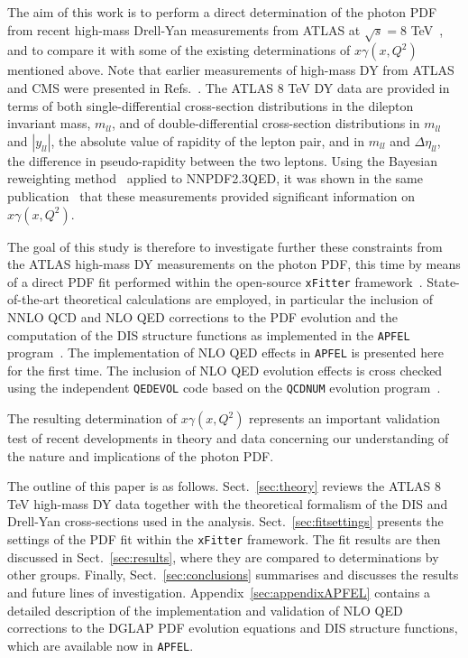 The aim of this work is to perform a direct determination of the
photon PDF from recent high-mass Drell-Yan measurements from
ATLAS  at $\sqrt{s}=8$ TeV~\cite{Aad:2016zzw}, and to
compare it with some of the existing determinations of $x\gamma(x,Q^2)$
mentioned above.
%
Note that
earlier measurements of high-mass DY from ATLAS and CMS were presented
in Refs.~\cite{CMS:2014jea,Chatrchyan:2013tia,Aad:2013iua}.
%
The ATLAS 8 TeV DY data are provided in terms of both
single-differential cross-section distributions in the dilepton invariant mass,
$m_{ll}$, and of double-differential 
cross-section distributions in $m_{ll}$ and $|y_{ll}|$, the absolute value of rapidity of the
lepton pair, and in $m_{ll}$ and $\Delta\eta_{ll}$, the difference in
pseudo-rapidity between the two leptons.
%
Using the Bayesian reweighting method~\cite{Ball:2011gg,Ball:2010gb}
applied to NNPDF2.3QED, it was shown in the
same publication~\cite{Aad:2016zzw} that these
measurements provided significant information on $x\gamma(x,Q^2)$.

The goal of this study is therefore to investigate further these
constraints from the ATLAS high-mass DY measurements on the photon PDF,
this time by means of a direct PDF fit performed within the
open-source {\tt xFitter} framework~\cite{Alekhin:2014irh}.
%
State-of-the-art theoretical calculations are employed, in particular
the inclusion of  NNLO QCD and NLO QED corrections to the PDF evolution and
the computation of the DIS structure
functions as implemented in the {\tt APFEL} program~\cite{Bertone:2013vaa}.
%
The implementation of NLO QED effects in {\tt APFEL} is
presented here for
the first time.
%
The inclusion of NLO QED evolution effects is cross checked using the independent
{\tt QEDEVOL} code \cite{Sadykov:2014aua} based on the {\tt QCDNUM} evolution program~\cite{Botje:2010ay}.

%
The resulting determination of $x\gamma(x,Q^2)$
represents an important validation test of
recent developments in theory and data concerning
our understanding of the nature and implications
of the photon PDF.

The outline of this paper is as follows.
%
Sect.~\ref{sec:theory} reviews the ATLAS 8 TeV high-mass DY data together
with the theoretical formalism of the DIS and Drell-Yan cross-sections
used in the analysis.
%
Sect.~\ref{sec:fitsettings} presents the settings of the PDF
fit within the {\tt xFitter} framework.
% 
The fit results are then discussed in Sect.~\ref{sec:results}, where
they are compared to determinations by other groups.
%
Finally, Sect.~\ref{sec:conclusions} summarises and discusses the results and
future lines of investigation.
%
Appendix~\ref{sec:appendixAPFEL} contains a detailed
description of the implementation and validation of NLO QED
corrections to the DGLAP PDF evolution equations
and DIS structure functions, which are
available now in {\tt APFEL}.
